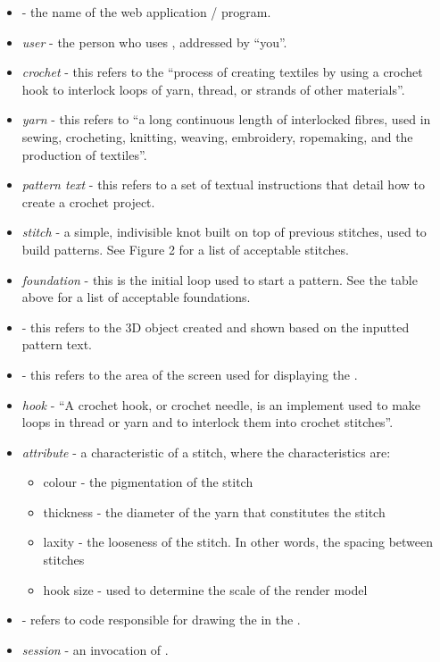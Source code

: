 \documentclass[main.tex]{subfiles}
\begin{document}
\begin{itemize}
\item \CC{} - the name of the web application / program.
\item \emph{user} - the person who uses \CC, addressed by ``you''. 
\item \emph{crochet} - this refers to the ``process of creating textiles by using a crochet hook to interlock loops of yarn, thread, or strands of other materials''.
\item \emph{yarn} - this refers to ``a long continuous length of interlocked fibres, used in sewing, crocheting, knitting, weaving, embroidery, ropemaking, and the production of textiles''.
\item \emph{pattern text} - this refers to a set of textual instructions that detail how to create a crochet project. 
\item \emph{stitch} - a simple, indivisible knot built on top of previous stitches, used to build patterns. See Figure 2 for a list of acceptable stitches.
\item \emph{foundation} - this is the initial loop used to start a pattern. See the table above for a list of acceptable foundations.
\item \RM{} - this refers to the 3D object created and shown based on the inputted pattern text.
\item \CRW{} - this refers to the area of the screen used for displaying the \RM.
\item \emph{hook} - ``A crochet hook, or crochet needle, is an implement used to make loops in thread or yarn and to interlock them into crochet stitches''.
\item \emph{attribute} - a characteristic of a stitch, where the characteristics are:
    \begin{itemize}\compact
        \item colour - the pigmentation of the stitch
        \item thickness - the diameter of the yarn that constitutes the stitch
        \item laxity - the looseness of the stitch. In other words, the spacing between stitches
        \item hook size - used to determine the scale of the render model
    \end{itemize}
\item \IR{} - refers to \CC{} code responsible for drawing the \RM{} in the \CRW.
\item \emph{session} - an invocation of \CC.

\end{itemize}
\end{document}
